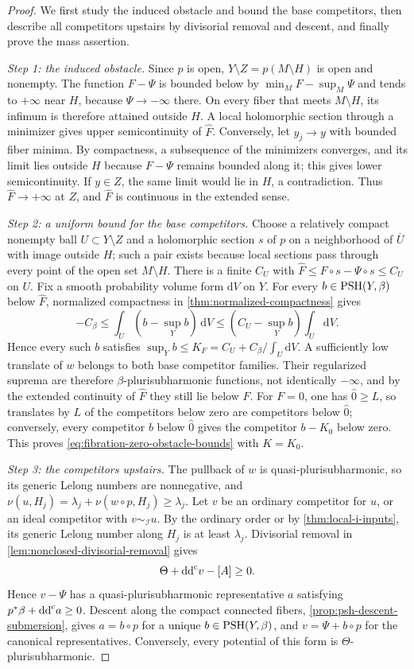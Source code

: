 \begin{proof}
We first study the induced obstacle and bound the base competitors, then describe all competitors upstairs by divisorial removal and descent, and finally prove the mass assertion.

\emph{Step 1: the induced obstacle.} Since $p$ is open, $Y\setminus Z=p(M\setminus H)$ is open and nonempty. The function $F-\Psi$ is bounded below by $\min_MF-\sup_M\Psi$ and tends to $+\infty$ near $H$, because $\Psi\to-\infty$ there. On every fiber that meets $M\setminus H$, its infimum is therefore attained outside $H$. A local holomorphic section through a minimizer gives upper semicontinuity of $\widehat F$. Conversely, let $y_j\to y$ with bounded fiber minima. By compactness, a subsequence of the minimizers converges, and its limit lies outside $H$ because $F-\Psi$ remains bounded along it; this gives lower semicontinuity. If $y\in Z$, the same limit would lie in $H$, a contradiction. Thus $\widehat F\to+\infty$ at $Z$, and $\widehat F$ is continuous in the extended sense.

\emph{Step 2: a uniform bound for the base competitors.} Choose a relatively compact nonempty ball $U\subset Y\setminus Z$ and a holomorphic section $s$ of $p$ on a neighborhood of $\overline U$ with image outside $H$; such a pair exists because local sections pass through every point of the open set $M\setminus H$. There is a finite $C_U$ with $\widehat F\leq F\circ s-\Psi\circ s\leq C_U$ on $U$. Fix a smooth probability volume form $\mathrm dV$ on $Y$. For every $b\in\mathrm{PSH}(Y,\beta)$ below $\widehat F$, normalized compactness in \cref{thm:normalized-compactness} gives
\[
 -C_\beta\leq\int_U(b-\sup_Yb)\,\mathrm dV
       \leq(C_U-\sup_Yb)\int_U\mathrm dV.
\]
Hence every such $b$ satisfies $\sup_Yb\leq K_F=C_U+C_\beta/\int_U\mathrm dV$. A sufficiently low translate of $w$ belongs to both base competitor families. Their regularized suprema are therefore $\beta$-plurisubharmonic functions, not identically $-\infty$, and by the extended continuity of $\widehat F$ they still lie below $\widehat F$. For $F=0$, one has $\widehat 0\geq L$, so translates by $L$ of the competitors below zero are competitors below $\widehat 0$; conversely, every competitor $b$ below $\widehat 0$ gives the competitor $b-K_0$ below zero. This proves \eqref{eq:fibration-zero-obstacle-bounds} with $K=K_0$.

\emph{Step 3: the competitors upstairs.} The pullback of $w$ is quasi-plurisubharmonic, so its generic Lelong numbers are nonnegative, and $\nu(u,H_j)=\lambda_j+\nu(w\circ p,H_j)\geq\lambda_j$. Let $v$ be an ordinary competitor for $u$, or an ideal competitor with $v\sim_{\mathcal I}u$. By the ordinary order or by \cref{thm:local-i-inputs}, its generic Lelong number along $H_j$ is at least $\lambda_j$. Divisorial removal in \cref{lem:nonclosed-divisorial-removal} gives
\[
 \Theta+\mathrm{dd}^{\mathrm{c}} v-[A]\geq0.
\]
Hence $v-\Psi$ has a quasi-plurisubharmonic representative $a$ satisfying $p^*\beta+\mathrm{dd}^{\mathrm{c}} a\geq0$. Descent along the compact connected fibers, \cref{prop:psh-descent-submersion}, gives $a=b\circ p$ for a unique $b\in\mathrm{PSH}(Y,\beta)$, and $v=\Psi+b\circ p$ for the canonical representatives. Conversely, every potential of this form is $\Theta$-plurisubharmonic.


\end{proof}
